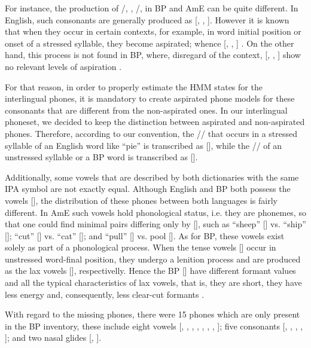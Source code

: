 For instance, the production of /, , /, 
in \ac{BP} and \ac{AmE} can be quite different. In English, such consonants are generally produced as 
[, , ]. However it is known that when they occur in certain contexts, 
for example, in word initial position or onset of a stressed syllable, they become aspirated; whence
[, , ] \citep{Lisker1985}. 
On the other hand, this process is not found in \ac{BP}, where, disregard of the context, [, , ] show no 
relevant levels of aspiration \citep{Klein1999}. 

For that reason, in order to properly estimate the \ac{HMM} states for the interlingual phones, it is mandatory
to create aspirated phone models for these consonants that are different from the non-aspirated ones. In our interlingual
phoneset, we decided to keep the distinction between aspirated and non-aspirated phones. Therefore, according to our
convention, the // that occurs in a stressed syllable of an English word like ``pie'' is transcribed as [], 
while the // of an unstressed syllable or a BP word is transcribed as []. 

Additionally, some vowels that are described by both dictionaries with the same \ac{IPA} symbol are not exactly equal.
Although English and \ac{BP} both possess the vowels [], the distribution
of these phones between both languages is fairly different. In \ac{AmE} such vowels hold phonological status, i.e. they 
are phonemes, so that one could find minimal pairs differing only by [], such as ``sheep'' [] vs. 
``ship'' []; ``cut'' [] vs. ``cat'' []; and ``pull'' 
[] vs. pool []. As for \ac{BP}, these vowels exist solely as part
of a phonological process. When the tense vowels [] occur in unstressed word-final position, they undergo a lenition process
and are produced as the lax vowels [], respectivelly. Hence the \ac{BP} [] have 
different formant values \cite{Fails1992} and all the typical characteristics of lax vowels, that is, they are short, 
they have less energy and, consequently, less clear-cut formants \cite{Nobre1987}.

With regard to the missing phones, there were 15 phones which are only present in the \ac{BP} inventory, these include eight vowels
[, , , , , , , ]; five
consonants [, \textipa{\textltailn}, , , ]; and two nasal glides
[, ]. 

